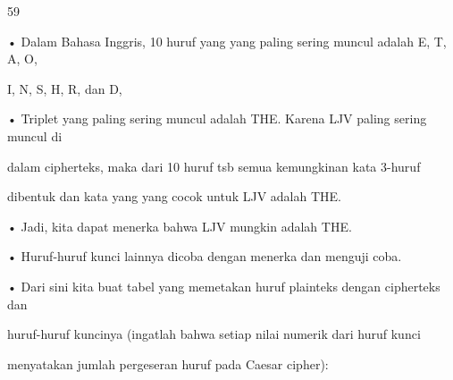 \documentclass{article}
\begin{document}

59

• Dalam Bahasa Inggris, 10 huruf yang yang paling sering muncul adalah E, T, A, O, 

I, N, S, H, R, dan D, 

• Triplet yang paling sering muncul adalah THE. Karena LJV paling sering muncul di 

dalam cipherteks, maka dari 10 huruf tsb semua kemungkinan kata 3-huruf 

dibentuk dan kata yang yang cocok untuk LJV adalah THE. 

• Jadi, kita dapat menerka bahwa LJV  mungkin adalah THE. 

• Huruf-huruf kunci lainnya dicoba dengan menerka dan menguji coba.

• Dari sini kita buat tabel yang memetakan huruf plainteks dengan cipherteks dan 

huruf-huruf kuncinya (ingatlah bahwa setiap nilai numerik dari huruf kunci 

menyatakan jumlah pergeseran huruf pada Caesar cipher):
\end{document}
